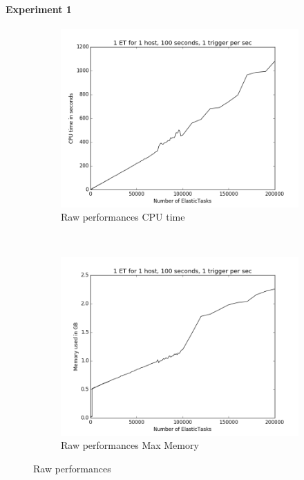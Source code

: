\documentclass[a4paper, onecolumn, 11pt]{article}
\begin{document}
    \paragraph{Experiment 1}
    \begin{figure}
    	\centering
    	\hspace*{-4em}
    	\begin{subfigure}[t]{0.6\textwidth}
    		\includegraphics[width=\textwidth]{../plots/raw_perf_time}
    		\caption{Raw performances CPU time}
    		\label{time_raw}
    	\end{subfigure}%
    	~
    	\begin{subfigure}[t]{0.6\textwidth}
    		\includegraphics[width=\textwidth]{../plots/raw_perf_mem}
    		\caption{Raw performances Max Memory}
    		\label{mem_raw}
    	\end{subfigure}%
    	\caption{Raw performances}
    \end{figure}
    
\end{document}

